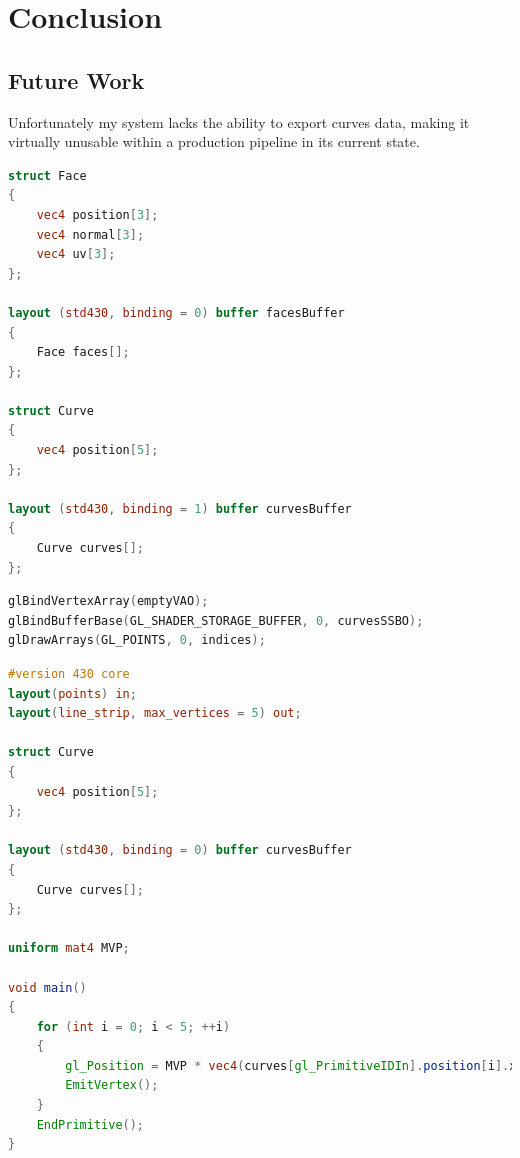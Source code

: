 \documentclass[]{acmsiggraph}
\begin{document}
\section{Conclusion} \label{sec:conclusion}

\subsection{Future Work} \label{sec:futurework}

Unfortunately my system lacks the ability to export curves data, making it virtually unusable within a production pipeline in its current state.




\newpage
\appendix

\begin{lstlisting}[language=GLSL, label={lst:buffers}, caption={Extract from the Distributor compute shader, showing how the Mesh and Curves buffers are accessed.}]
struct Face
{
	vec4 position[3];
	vec4 normal[3];
	vec4 uv[3];
};

layout (std430, binding = 0) buffer facesBuffer
{
	Face faces[];
};

struct Curve
{
	vec4 position[5];
};

layout (std430, binding = 1) buffer curvesBuffer
{
	Curve curves[];
};
\end{lstlisting}

\begin{lstlisting}[language=C++, label={lst:rendercpp}, caption={Extract from the C++ application code showing how Curves are rendered procedurally. \texttt{emptyVAO} is an empty Vertex Array Object, \texttt{curvesSSBO} is a \texttt{GL\_SHADER\_STORAGE\_BUFFER} containing vertex data for multiple curves, and \texttt{indices} is the number of curves in the buffer.}]
glBindVertexArray(emptyVAO);
glBindBufferBase(GL_SHADER_STORAGE_BUFFER, 0, curvesSSBO);
glDrawArrays(GL_POINTS, 0, indices);
\end{lstlisting}

\begin{lstlisting}[language=GLSL, label={lst:renderglsl}, caption={Extract from the curves rendering geometry shader, showing how vertex positions were processed from data stored in a bound \texttt{GL\_SHADER\_STORAGE\_BUFFER}.}]
#version 430 core
layout(points) in;
layout(line_strip, max_vertices = 5) out;

struct Curve
{
	vec4 position[5];
};

layout (std430, binding = 0) buffer curvesBuffer
{
	Curve curves[];
};

uniform mat4 MVP;

void main()
{
	for (int i = 0; i < 5; ++i)
	{
		gl_Position = MVP * vec4(curves[gl_PrimitiveIDIn].position[i].xyz, 1.0);
		EmitVertex();
	}
	EndPrimitive();
}
\end{lstlisting}
\end{document}
